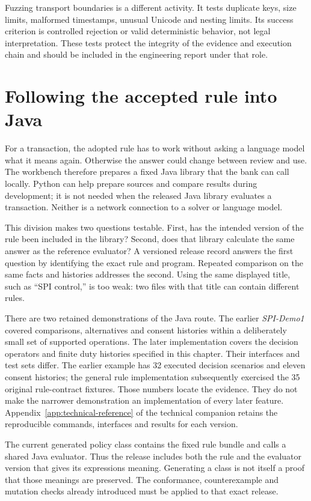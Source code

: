 Fuzzing transport boundaries is a different activity. It tests duplicate keys,
size limits, malformed timestamps, unusual Unicode and nesting limits. Its
success criterion is controlled rejection or valid deterministic behavior, not
legal interpretation. These tests protect the integrity of the evidence and
execution chain and should be included in the engineering report under that role.

\section{Following the accepted rule into Java}
\label{sec:reader-java}

For a transaction, the adopted rule has to work without asking a language model
what it means again. Otherwise the answer could change between review and use.
The workbench therefore prepares a fixed Java library that the bank can call
locally. Python can help prepare sources and compare results during development;
it is not needed when the released Java library evaluates a transaction. Neither
is a network connection to a solver or language model.

This division makes two questions testable. First, has the intended version of
the rule been included in the library? Second, does that library calculate the
same answer as the reference evaluator? A versioned release record answers the
first question by identifying the exact rule and program. Repeated comparison
on the same facts and histories addresses the second. Using the same displayed
title, such as ``SPI control,'' is too weak: two files with that title can
contain different rules.

There are two retained demonstrations of the Java route. The earlier
\emph{SPI-Demo1} covered comparisons, alternatives and consent histories within
a deliberately small set of supported operations. The later implementation
covers the decision operators and finite duty histories specified in this
chapter. Their interfaces and test sets differ. The earlier example has 32
executed decision scenarios and eleven consent histories; the general rule
implementation subsequently exercised the 35 original rule-contract fixtures.
Those numbers locate the evidence. They do not make the narrower demonstration
an implementation of every later feature. Appendix~\ref{app:technical-reference} of the technical companion
retains the reproducible commands, interfaces and results for each version.

The current generated policy class contains the fixed rule bundle and calls a
shared Java evaluator. Thus the release includes both the rule and the evaluator
version that gives its expressions meaning. Generating a class is not itself a
proof that those meanings are preserved. The conformance, counterexample and
mutation checks already introduced must be applied to that exact release.

